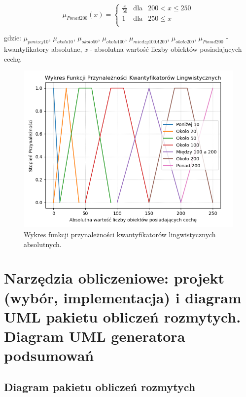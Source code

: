 \documentclass{classrep}
\begin{document}
\begin{equation}
\mu _{Ponad200}(x) =  \left\{ \begin{array}{rcl}
\frac{x}{50} & \mbox{dla} & 200 < x \leq 250\\
1 & \mbox{dla} & 250 \leq x\\
\end{array}\right.
\end{equation}

gdzie: \(\mu _{ponizej10}\), \(\mu _{okolo10}\), \(\mu _{okolo50}\), \(\mu _{okolo100}\), \(\mu _{miedzy100A200}\), \(\mu _{okolo200}\), \(\mu _{Ponad200}\)  - kwantyfikatory absolutne, \textit{x} - absolutna wartość liczby obiektów posiadających cechę. 

\begin{figure}[h!]
 \centering
 \includegraphics[width=14cm]{kwantyfikatory_absolutny.png}
 \vspace{-0.3cm}
 \caption{Wykres funkcji przynależności kwantyfikatorów lingwistycznych absolutnych. }
 \label{kwantyfikatory_lingwistyczne_absolutne}
\end{figure}
\newpage

\section{Narzędzia obliczeniowe: projekt (wybór, implementacja) i diagram UML pakietu obliczeń rozmytych. Diagram UML generatora podsumowań}
\subsection{Diagram pakietu obliczeń rozmytych}
\end{document}
